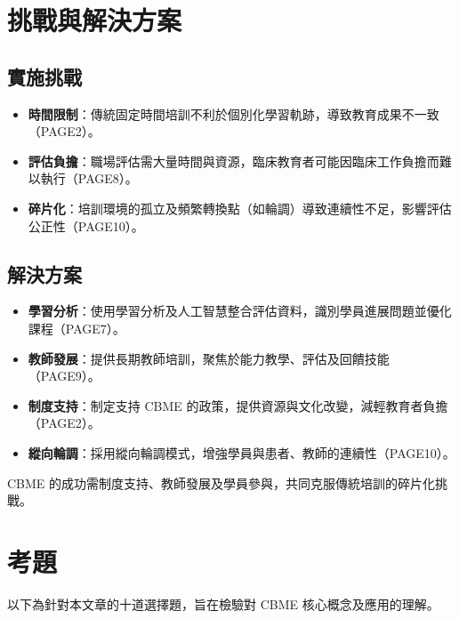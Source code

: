\documentclass[12pt,a4paper]{article}
\newcommand{\note}[1]{
    \par
    \noindent
    \begin{tcolorbox}[
        colback=emergency_blue!5!white,
        colframe=emergency_blue,
        title=\textbf{重點提醒},
        fonttitle=\bfseries,
        boxrule=0.5pt,
        arc=3pt,
        left=6pt,
        right=6pt,
        top=6pt,
        bottom=6pt
    ]
    #1
    \end{tcolorbox}
}
\begin{document}
\section{挑戰與解決方案}

\subsection{實施挑戰}
\begin{itemize}[nosep]
    \item \textbf{時間限制}：傳統固定時間培訓不利於個別化學習軌跡，導致教育成果不一致（PAGE2）。
    \item \textbf{評估負擔}：職場評估需大量時間與資源，臨床教育者可能因臨床工作負擔而難以執行（PAGE8）。
    \item \textbf{碎片化}：培訓環境的孤立及頻繁轉換點（如輪調）導致連續性不足，影響評估公正性（PAGE10）。
\end{itemize}

\subsection{解決方案}
\begin{itemize}[nosep]
    \item \textbf{學習分析}：使用學習分析及人工智慧整合評估資料，識別學員進展問題並優化課程（PAGE7）。
    \item \textbf{教師發展}：提供長期教師培訓，聚焦於能力教學、評估及回饋技能（PAGE9）。
    \item \textbf{制度支持}：制定支持 CBME 的政策，提供資源與文化改變，減輕教育者負擔（PAGE2）。
    \item \textbf{縱向輪調}：採用縱向輪調模式，增強學員與患者、教師的連續性（PAGE10）。
\end{itemize}

\vspace{0.5cm}
\note{
CBME 的成功需制度支持、教師發展及學員參與，共同克服傳統培訓的碎片化挑戰。
}

\section{考題}

以下為針對本文章的十道選擇題，旨在檢驗對 CBME 核心概念及應用的理解。
\end{document}
